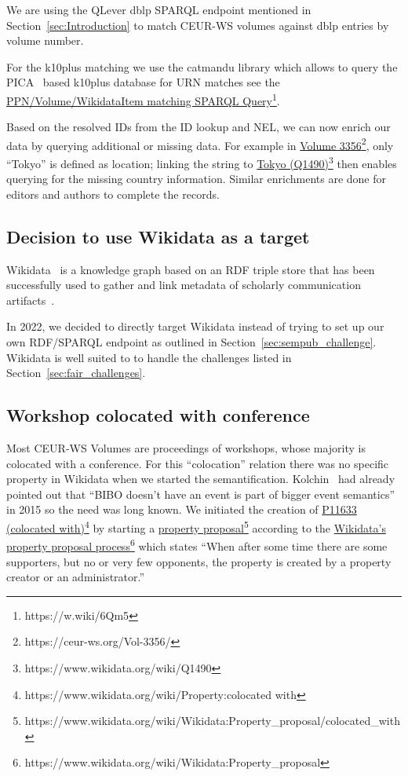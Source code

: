 \documentclass[]{ceurart}
\newcommand{\tquote}[1]{``#1''}
\newcommand{\footnotelink}[2]{\href{#1}{#2}\footnote{#1}}
\newcommand{\wdq}[2]{\footnotelink{https://www.wikidata.org/wiki/#2}{#1 (#2)}}
\newcommand{\wdp}[2]{\footnotelink{https://www.wikidata.org/wiki/Property:#2}{#1 (#2)}}
\begin{document}
We are using the QLever dblp SPARQL endpoint mentioned in Section~\ref{sec:Introduction} to match CEUR-WS volumes against dblp entries by volume number.

For the k10plus matching we use the catmandu library which allows to query the PICA~\cite{Costers1997} based k10plus database for URN matches see the  \footnotelink{https://w.wiki/6Qm5}{PPN/Volume/WikidataItem matching SPARQL Query}. 

Based on the resolved IDs from the ID lookup and NEL, we can now enrich our data by querying additional or missing data.
For example in \footnotelink{https://ceur-ws.org/Vol-3356/}{Volume 3356}, only \tquote{Tokyo} is defined as location; linking the string to \wdq{Tokyo}{Q1490} then enables querying for the missing country information.
Similar enrichments are done for editors and authors to complete the records.

\subsection{Decision to use Wikidata as a target}\label{sec:wikidata_decision}
Wikidata~\cite{Vrandecic2014} is a knowledge graph based on an RDF triple store that has been successfully used to gather and link metadata of scholarly communication artifacts~\cite{Nielsen2017}. 

In 2022, we decided to directly target Wikidata instead of trying to set up our own RDF/SPARQL endpoint as outlined in Section~\ref{sec:sempub_challenge}. 
Wikidata is well suited to to handle the challenges listed in Section~\ref{sec:fair_challenges}.

\subsection{Workshop colocated with conference}
Most CEUR-WS Volumes are proceedings of workshops, whose majority is colocated with a conference. For this  \tquote{colocation} relation there was no specific property in Wikidata when we started the semantification. Kolchin~\cite{Kolchin2015} had already pointed out that \tquote{BIBO doesn't have an event is part of bigger event semantics} in 2015 so the need was long known.
We initiated the creation of \wdp{P11633}{colocated with} by starting a \footnotelink{https://www.wikidata.org/wiki/Wikidata:Property\_proposal/colocated\_with}{property proposal} according to the \footnotelink{https://www.wikidata.org/wiki/Wikidata:Property\_proposal}{Wikidata's property proposal process} which states \tquote{When after some time there are some supporters, but no or very few opponents, the property is created by a property creator or an administrator.}
\end{document}
